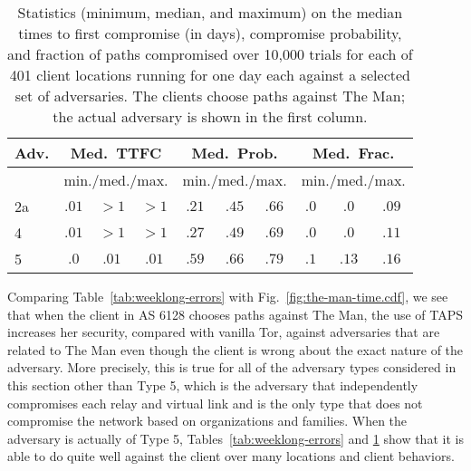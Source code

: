 \documentclass[conference]{styles/IEEEtran}
\newcommand{\ps}{TAPS\xspace}
\begin{document}
\begin{table}
\begin{center}
\begin{tabular}{|l|c|c|c|c|c|c|c|c|c|}\hline
Adv. & \multicolumn{3}{|c|}{Med.\ TTFC} & \multicolumn{3}{|c|}{Med.\ Prob.} & \multicolumn{3}{|c|}{Med.\ Frac.} \\ \hline
& \multicolumn{3}{|c|}{min./med./max.} & \multicolumn{3}{|c|}{min./med./max.} & \multicolumn{3}{|c|}{min./med./max.} \\ \hline
2a & $.01$ & $>1$ & $>1$ & $.21$ & $.45$ & $.66$ & $.0$ & $.0$ &  $.09$  \\ \hline
4 & $.01$ & $>1$ & $>1$ & $.27$ & $.49$ & $.69$ & $.0$ & $.0$ &  $.11$  \\ \hline
5 & $.0$ & $.01$ & $.01$ & $.59$ & $.66$ & $.79$ & $.1$ & $.13$ &  $.16$  \\ \hline
\end{tabular}
\end{center}
\vspace{-2mm}
\caption{\small Statistics (minimum, median, and maximum) on the median times to first compromise (in days), compromise probability, and fraction of paths compromised over 10,000 trials for each of 401 client locations running for one day each against a selected set of adversaries.  The clients choose paths against \textsf{The Man}; the actual adversary is shown in the first column.}\label{tab:day-errors}
\vspace{-4mm}
\end{table}

Comparing Table~\ref{tab:weeklong-errors} with Fig.~\ref{fig:the-man-time.cdf}, we see that when the
client in AS 6128 chooses paths against \textsf{The Man}, the use of \ps increases her security,
compared with vanilla Tor, against adversaries that are related to \textsf{The Man} even though the
client is wrong about the exact nature of the adversary. More precisely, this is true for all of
the adversary types considered in this section other than Type 5, which is the adversary that
independently compromises each relay and virtual link and is the only type that does not
compromise the network based on organizations and families. When the adversary is actually of Type
5, Tables~\ref{tab:weeklong-errors} and \ref{tab:day-errors} show that it is able to do quite well
against the client over many locations and client behaviors.
\end{document}
